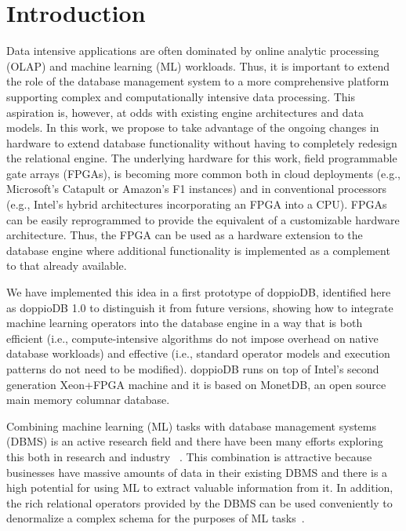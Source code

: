 \documentclass[11pt,dvipdfm]{article}
\begin{document}
 \section{Introduction}
Data intensive applications are often dominated by online analytic processing (OLAP) and machine learning (ML) workloads. Thus, it is important to extend the role of the database management system to a more comprehensive platform supporting complex and computationally intensive data processing. This aspiration is, however, at odds with existing engine architectures and data models. In this work, we propose to take advantage of the ongoing changes in hardware to extend database functionality without having to completely redesign the relational engine. The underlying hardware for this work, field programmable gate arrays (FPGAs), is becoming more common both in cloud deployments (e.g., Microsoft's Catapult or Amazon's F1 instances) and in conventional processors (e.g., Intel's hybrid architectures incorporating an FPGA into a CPU). FPGAs can be easily reprogrammed to provide the equivalent of a customizable hardware architecture. Thus, the FPGA can be used as a hardware extension to the database engine where additional functionality is implemented as a complement to that already available. 

We have implemented this idea in a first prototype of doppioDB, identified here as doppioDB 1.0 to distinguish it from future versions, showing how to integrate machine learning operators into the database engine in a way that is both efficient (i.e., compute-intensive algorithms do not impose overhead on native database workloads) and effective (i.e., standard operator models and execution patterns do not need to be modified). doppioDB runs on top of Intel's second generation Xeon+FPGA machine and it is based on MonetDB, an open source main memory columnar database.

 Combining machine learning (ML) tasks with database management systems (DBMS) is an active research field and there have been many efforts exploring this both in research \cite{hellerstein2012madlib, passing2017sql, aref2015design, cai2013simulation, mahajan2018rdbms} and industry ~\cite{farber2012sap,Tamayo2005}. This combination is attractive because businesses have massive amounts of data in their existing DBMS and there is a high potential for using ML to extract valuable information from it. In addition, the rich relational operators provided by the DBMS can be used conveniently to denormalize a complex schema for the purposes of ML tasks~\cite{wisconsinJoins2015}. 
\end{document}
